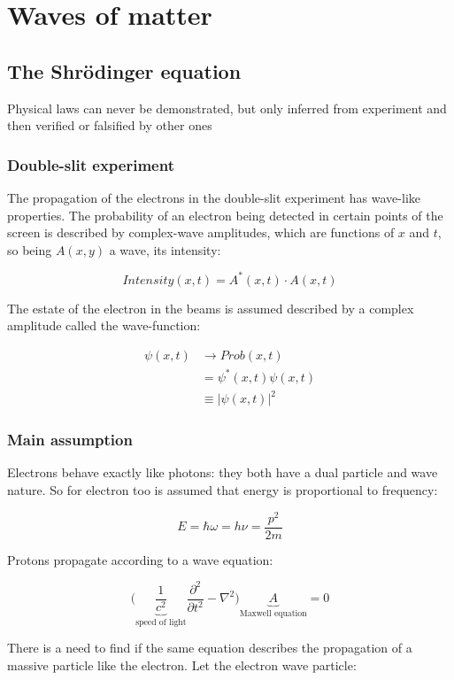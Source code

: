 \chapter{Waves of matter}

\section{The Shr\"odinger equation}
Physical laws can never be demonstrated, but only inferred from experiment and then verified or falsified by other ones


  \subsection{Double-slit experiment}
  The propagation of the electrons in the double-slit experiment has wave-like properties.
  The probability of an electron being detected in certain points of the screen is described by complex-wave amplitudes, which are functions of $x$ and $t$, so being $A(x,y)$ a wave, its intensity:

  $$Intensity(x,t) = A^*(x,t)\cdot A(x,t)$$

  The estate of the electron in the beams is assumed described by a complex amplitude called the wave-function:

  \begin{align*}
    \psi(x,t) &\rightarrow Prob(x,t)\\
              &=\psi^*(x,t)\psi(x,t)\\
              &\equiv |\psi(x,t)|^2
  \end{align*}

  \subsection{Main assumption}
  Electrons behave exactly like photons: they both have a dual particle and wave nature.
  So for electron too is assumed that energy is proportional to frequency:

  $$E = \hbar\omega = h\nu = \frac{p^2}{2m}$$

  Protons propagate according to a wave equation:

  $$\biggl(\underbrace{\frac{1}{c^2}}_{\text{speed of light}}\frac{\partial^2{}}{\partial{t^2}} - \nabla^2\biggr)\underbrace{A}_{\text{Maxwell equation}} = 0$$

  There is a need to find if the same equation describes the propagation of a massive particle like the electron.
  Let the electron wave particle:

